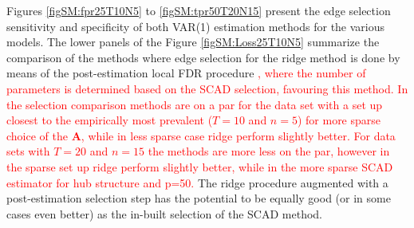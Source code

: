 \documentclass[a4paper,11pt]{article}
\begin{document}
Figures  \ref{figSM:fpr25T10N5} to \ref{figSM:tpr50T20N15} present the edge selection sensitivity and specificity of both VAR(1) estimation methods for the various models. The lower panels of the Figure \ref{figSM:Loss25T10N5} summarize the comparison of the methods where edge selection for the ridge method is done by means of the post-estimation local FDR procedure \textcolor{red}{, where the number of parameters is determined based on the SCAD selection, favouring this method. In the selection comparison methods are on a par for the data set with a set up closest to the empirically most prevalent ($T=10$ and $n=5$) for more sparse choice of the $\mathbf{A}$, while in less sparse case ridge perform slightly better. For data sets with $T=20$ and $n=15$ the methods are more less on the par, however in the sparse set up ridge perform slightly better, while in the more sparse SCAD estimator for hub structure and p=50.} The ridge procedure augmented with a post-estimation selection step has the potential to be equally good (or in some cases even better) as the in-built selection of the SCAD method.


\end{document}
